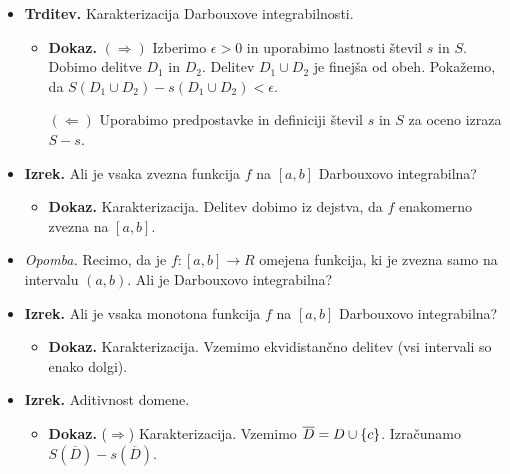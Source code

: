 \begin{enumerate}
\begin{itemize}
        \newpage
        \item \colorbox{blue!30}{\textbf{Trditev.}} Karakterizacija Darbouxove integrabilnosti.
        \begin{itemize}
            \item \colorbox{green!30}{\textbf{Dokaz.}} $(\Rightarrow)$ Izberimo $\epsilon > 0$ in uporabimo lastnosti števil $s$ in $S$. Dobimo delitve $D_1$ in $D_2$. Delitev $D_1 \cup D_2$ je finejša od obeh. Pokažemo, da $S(D_1 \cup D_2) - s(D_1 \cup D_2) < \epsilon$.
            
            $(\Leftarrow)$ Uporabimo predpostavke in definiciji števil $s$ in $S$ za oceno izraza $S - s$.
        \end{itemize}
        \item \colorbox{blue!30}{\textbf{Izrek.}} Ali je vsaka zvezna funkcija $f$ na $[a,b]$ Darbouxovo integrabilna?
        \begin{itemize}
            \item \colorbox{green!30}{\textbf{Dokaz.}} Karakterizacija. Delitev dobimo iz dejstva, da $f$ enakomerno zvezna na $[a,b]$.
        \end{itemize}
        \item \colorbox{yellow!30}{\emph{Opomba.}} Recimo, da je $f: [a,b] \to R$ omejena funkcija, ki je zvezna samo na intervalu $(a, b)$. Ali je Darbouxovo integrabilna?
        \item \colorbox{blue!30}{\textbf{Izrek.}} Ali je vsaka monotona funkcija $f$ na $[a,b]$ Darbouxovo integrabilna?
        \begin{itemize}
            \item \colorbox{green!30}{\textbf{Dokaz.}} Karakterizacija. Vzemimo ekvidistančno delitev (vsi intervali so enako dolgi).
        \end{itemize}
        \item \colorbox{blue!30}{\textbf{Izrek.}} Aditivnost domene.
        \begin{itemize}
            \item \colorbox{green!30}{\textbf{Dokaz.}} ($\Rightarrow$) Karakterizacija. Vzemimo $\overline{D} = D \cup \left\{c\right\}$. Izračunamo $S(\overline{D}) - s (\overline{D})$.            
            

\end{itemize}
\end{itemize}
\end{enumerate}
